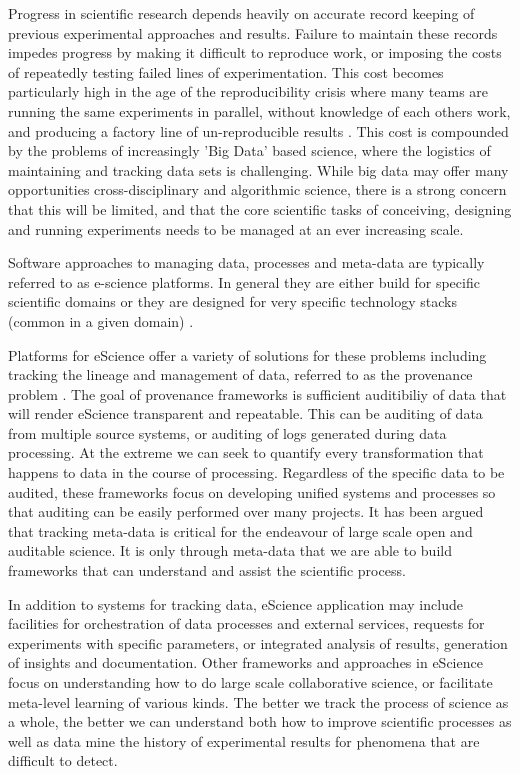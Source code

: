 \documentclass[sigconf]{acmart}
\begin{document}
Progress in scientific research depends heavily on accurate record keeping of previous
experimental approaches and results. Failure to maintain these records impedes progress
by making it difficult to reproduce work, or imposing the costs of repeatedly testing 
failed lines of experimentation. This cost becomes particularly high in the age of the
reproducibility crisis where many teams are running the same experiments in parallel, without
knowledge of each others work, and producing a factory line of un-reproducible results 
\cite{Ioannidis2005}. This cost is compounded by the problems of increasingly 'Big Data' 
based science, where the logistics of maintaining and tracking data sets is challenging.
While big data may offer many opportunities cross-disciplinary and algorithmic science\cite{Schmitt2015}, 
there is a strong concern that this will be limited\cite{Succi2019}, 
and that the core scientific tasks of conceiving,
designing and running experiments needs to be managed at an ever increasing scale.

Software approaches to managing data, processes and meta-data are typically referred to 
as e-science platforms. In general they are either build for specific scientific domains
\cite{Howe2008,} or they are designed for very specific technology stacks (common in a given domain)
\cite{Subramanian2013}. 

Platforms for eScience offer a variety of solutions for these problems including  
tracking the lineage and management of data, referred to as 
the provenance problem \cite{Sahoo:2008,Conquest:2021}.
The goal of provenance frameworks is sufficient auditibiliy of data that will 
render eScience transparent and repeatable. This can be auditing of data from multiple 
source systems, or auditing of logs generated during data processing\cite{Ferdous2020}. 
At the extreme we can seek to quantify every transformation that happens to data in 
the course of processing\cite{Sahoo2009}. Regardless of the
specific data to be audited, these frameworks focus on developing unified systems and 
processes so that auditing can be easily performed over many projects. It has been 
argued that tracking meta-data is critical for the endeavour of large scale open and auditable 
science\cite{Reznik2022}. It is only through meta-data that we are able to build frameworks
that can understand and assist the scientific process.

In addition to systems for tracking data, eScience application may include facilities
for orchestration of data processes and external services\cite{Subramanian2013}, 
requests for experiments with specific parameters\cite{Hunter:2005}, 
or integrated analysis of results, generation of insights and documentation. 
Other frameworks and approaches in eScience focus on understanding how to do large 
scale collaborative science, or facilitate meta-level learning of various 
kinds\cite{Hunter:2005,Liu:2023}. The better we track the
process of science as a whole, the better we can understand both how to improve 
scientific processes as well as data mine the history of experimental results for 
phenomena that are difficult to detect.
\end{document}
